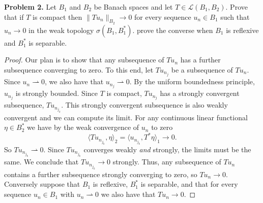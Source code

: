 \documentclass[11pt,letterpaper]{report}
\newcommand{\mcal}[1]{\mathcal{#1}}
\newcommand{\weak}{\rightharpoonup}
\begin{document}
\noindent\textbf{Problem 2. }Let $B_1$ and $B_2$ be Banach spaces and let $T\in \mcal{L}(B_1, B_2)$. Prove that if $T$ is compact then $\|Tu_n\|_{B_2}\to 0$ for every sequence $u_n\in B_1$ such that $u_n\to 0$ in the weak topology $\sigma(B_1, B_1^*)$. prove the converse when $B_1$ is reflexive and $B_1^*$ is separable.
\begin{proof}
	Our plan is to show that any subsequence of $Tu_n$ has a further subsequence converging to zero. To this end, let $Tu_{n_j}$ be a subsequence of $Tu_n$. Since $u_n \rightharpoonup 0$, we also have that $u_{n_j}\weak 0$. By the uniform boundedness principle, $u_{n_j}$ is strongly bounded. Since $T$ is compact, $Tu_{n_j}$ has a strongly convergent subsequence, $Tu_{n_{j_k}}$. This strongly convergent subsequence is also weakly convergent and we can compute its limit. For any continuous linear functional $\eta \in B_2^*$ we have by the weak convergence of $u_n$ to zero
	\[
	\langle Tu_{n_{j_k}}, \eta\rangle_2 = \langle u_{n_{j_k}}, T^*\eta\rangle_1 \to 0.
	\]
	So $Tu_{n_{j_k}}\weak 0$. Since $Tu_{n_{j_k}}$ converges weakly \textit{and} strongly, the limits must be the same. We conclude that $Tu_{n_{j_k}} \to 0$ strongly. Thus, any subsequence of $Tu_n$ contains a further subsequence strongly converging to zero, so $Tu_n \to 0$.\\

	\noindent Conversely suppose that $B_1$ is reflexive, $B_1^*$ is separable, and that for every sequence $u_n\in B_1$ with $u_n\weak 0$ we also have that $Tu_n\to 0$.
\end{proof}
\end{document}
